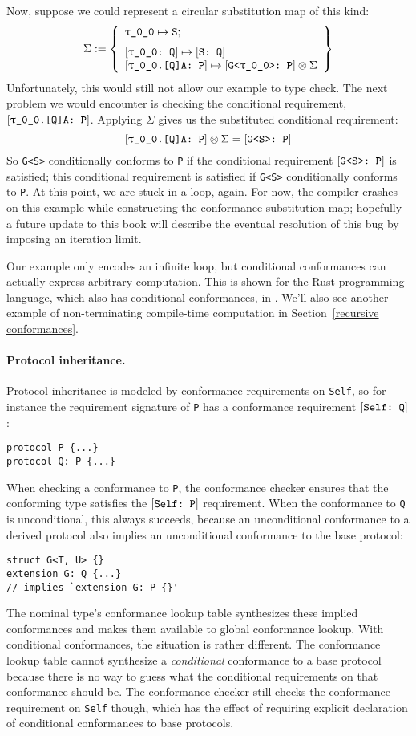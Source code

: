 \documentclass[../generics]{subfiles}
\begin{document}
\begin{example}
Now, suppose we could represent a circular substitution map of this kind:
\[\Sigma := \SubstMapLongC{\SubstType{\ttgp{0}{0}}{S}}{
\SubstConf{\ttgp{0}{0}}{S}{Q}\\
\ConfReq{\ttgp{0}{0}.[Q]A}{P}\mapsto\ConfReq{G<\ttgp{0}{0}>}{P}\otimes\Sigma
}\]
Unfortunately, this would still not allow our example to type check. The next problem we would encounter is checking the conditional requirement, $[\texttt{\texttt{$\uptau$\_0\_0}.[Q]A:~P}]$. Applying $\Sigma$ gives us the substituted conditional requirement:
\[[\texttt{\texttt{$\uptau$\_0\_0}.[Q]A:~P}]\otimes\Sigma=[\texttt{G<S>:~P}]\]
So \texttt{G<S>} conditionally conforms to \texttt{P} if the conditional requirement $[\texttt{G<S>:~P}]$ is satisfied; this conditional requirement is satisfied if \texttt{G<S>} conditionally conforms to \texttt{P}. At this point, we are stuck in a loop, again. For now, the compiler crashes on this example while constructing the conformance substitution map; hopefully a future update to this book will describe the eventual resolution of this bug by imposing an iteration limit.

Our example only encodes an infinite loop, but conditional conformances can actually express arbitrary computation. This is shown for the Rust programming language, which also has conditional conformances, in \cite{rustturing}. We'll also see another example of non-terminating compile-time computation in Section~\ref{recursive conformances}.
\end{example}

\paragraph{Protocol inheritance.}
Protocol inheritance is modeled by conformance requirements on \texttt{Self}, so for instance the requirement signature of \verb|P| has a conformance requirement $[\texttt{Self:~Q}]$:
\begin{Verbatim}
protocol P {...}
protocol Q: P {...}
\end{Verbatim}
When checking a conformance to \texttt{P}, the conformance checker ensures that the conforming type satisfies the $[\texttt{Self:~P}]$ requirement. When the conformance to \texttt{Q} is unconditional, this always succeeds, because an unconditional conformance to a derived protocol also implies an unconditional conformance to the base protocol:
\begin{Verbatim}
struct G<T, U> {}
extension G: Q {...}
// implies `extension G: P {}'
\end{Verbatim}
The nominal type's conformance lookup table synthesizes these implied conformances and makes them available to global conformance lookup. With conditional conformances, the situation is rather different. The conformance lookup table cannot synthesize a \emph{conditional} conformance to a base protocol because there is no way to guess what the conditional requirements on that conformance should be. The conformance checker still checks the conformance requirement on \texttt{Self} though, which has the effect of requiring explicit declaration of conditional conformances to base protocols.
\end{document}
